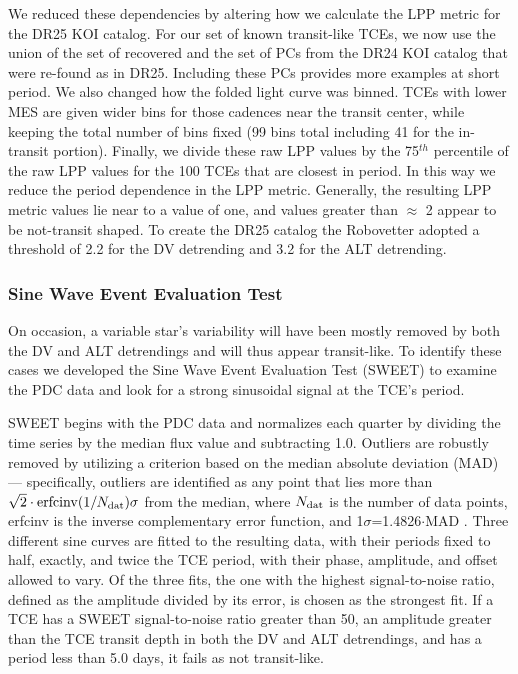 We reduced these dependencies by altering how we calculate the LPP metric for the DR25 KOI catalog. For our set of known transit-like TCEs, we now use the union of the set of recovered  and the set of PCs from the DR24 KOI catalog \citep{Coughlin2016} that were re-found as  in DR25. Including these PCs provides more examples at short period. We also changed how the folded light curve was binned. TCEs with lower MES are given wider bins for those cadences near the transit center, while keeping the total number of bins fixed (99 bins total including 41 for the in-transit portion). Finally, we divide these raw LPP values by the 75$^{th}$ percentile of the raw LPP values for the 100 TCEs that are closest in period.  In this way we reduce the period dependence in the LPP metric.  Generally, the resulting LPP metric values lie near to a value of one, and values greater than $\approx$ 2 appear to be not-transit shaped.  To create the DR25 catalog the Robovetter adopted a threshold of 2.2 for the DV detrending and 3.2 for the ALT detrending.





\subsubsection{Sine Wave Event Evaluation Test}
\label{s:sweetntl}

On occasion, a variable star's variability will have been mostly removed by both the DV and ALT detrendings and will thus appear transit-like. To identify these cases we developed the Sine Wave Event Evaluation Test (SWEET) to examine the PDC data and look for a strong sinusoidal signal at the TCE's period. 

SWEET begins with the PDC data and normalizes each quarter by dividing the time series by the median flux value and subtracting 1.0. Outliers are robustly removed by utilizing a criterion based on the median absolute deviation (MAD) --- specifically, outliers are identified as any point that lies more than $\sqrt{2}\cdot\mathrm{erfcinv}(1/N_{\rm dat})\sigma$ from the median, where $N_{\rm dat}$ is the number of data points, erfcinv is the inverse complementary error function, and 1$\sigma$=1.4826$\cdot$MAD \citep[see][]{Hampel1974,Ruppert2010}. Three different sine curves are fitted to the resulting data, with their periods fixed to half, exactly, and twice the TCE period, with their phase, amplitude, and offset allowed to vary. Of the three fits, the one with the highest signal-to-noise ratio, defined as the amplitude divided by its error, is chosen as the strongest fit. If a TCE has a SWEET signal-to-noise ratio greater than 50, an amplitude greater than the TCE transit depth in both the DV and ALT detrendings, and has a period less than 5.0 days, it fails as not transit-like.

